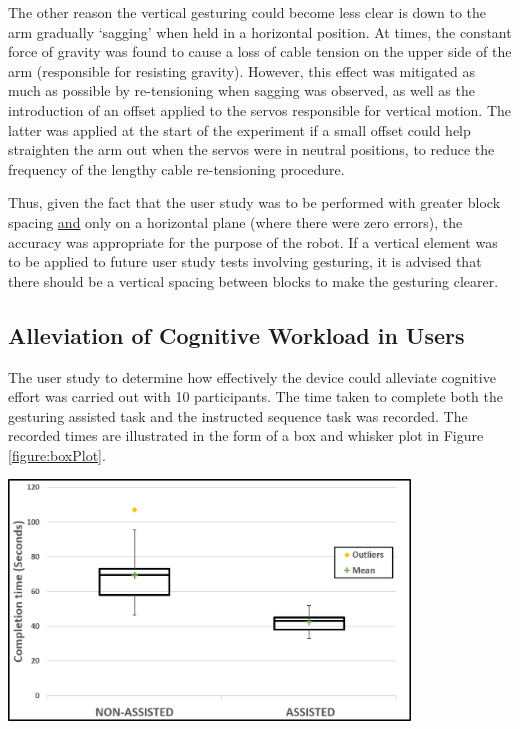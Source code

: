 \documentclass[11pt]{article}
\begin{document}
The other reason the vertical gesturing could become less clear is down to the arm gradually `sagging' when held in a horizontal position. At times, the constant force of gravity was found to cause a loss of cable tension on the upper side of the arm (responsible for resisting gravity). However, this effect was mitigated as much as possible by re-tensioning when sagging was observed, as well as the introduction of an offset applied to the servos responsible for vertical motion. The latter was applied at the start of the experiment if a small offset could help straighten the arm out when the servos were in neutral positions, to reduce the frequency of the lengthy cable re-tensioning procedure.

Thus, given the fact that the user study was to be performed with greater block spacing \underline{and} only on a horizontal plane (where there were zero errors), the accuracy was appropriate for the purpose of the robot. If a vertical element was to be applied to future user study tests involving gesturing, it is advised that there should be a vertical spacing between blocks to make the gesturing clearer.

\subsection{Alleviation of Cognitive Workload in Users}

The user study to determine how effectively the device could alleviate cognitive effort was carried out with 10 participants. The time taken to complete both the gesturing assisted task and the instructed sequence task was recorded. The recorded times are illustrated in the form of a box and whisker plot in Figure \ref{figure:boxPlot}.

\begin{center}
\includegraphics[width=0.8\textwidth]{images/boxPlot.png}
\label{figure:boxPlot}
\end{center}
\end{document}
